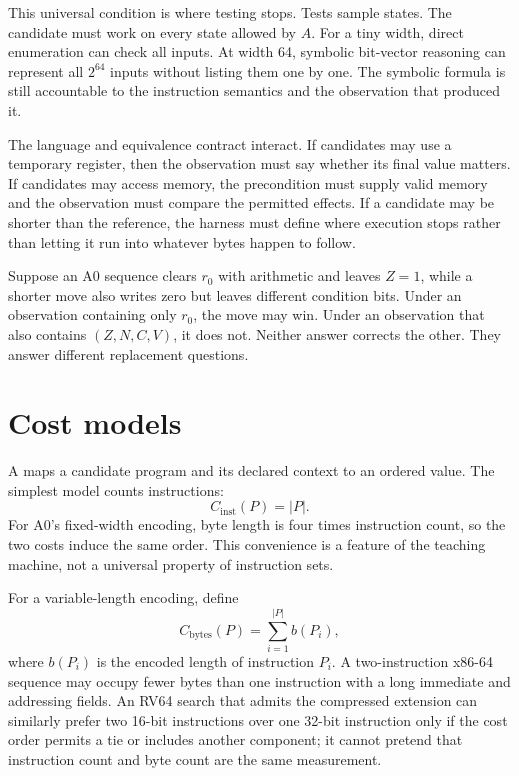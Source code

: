 This universal condition is where testing stops. Tests sample states. The
candidate must work on every state allowed by \(A\). For a tiny width, direct
enumeration can check all inputs. At width 64, symbolic bit-vector reasoning
can represent all \(2^{64}\) inputs without listing them one by one. The
symbolic formula is still accountable to the instruction semantics and the
observation that produced it.

The language and equivalence contract interact. If candidates may use a
temporary register, then the observation must say whether its final value
matters. If candidates may access memory, the precondition must supply valid
memory and the observation must compare the permitted effects. If a candidate
may be shorter than the reference, the harness must define where execution
stops rather than letting it run into whatever bytes happen to follow.

\begin{example}[title={One omitted flag changes the winner}]
Suppose an A0 sequence clears \(r_0\) with arithmetic and leaves \(Z=1\), while
a shorter move also writes zero but leaves different condition bits. Under an
observation containing only \(r_0\), the move may win. Under an observation
that also contains \((Z,N,C,V)\), it does not. Neither answer corrects the
other. They answer different replacement questions.
\end{example}

\section{Cost models}

A  maps a candidate program and its declared context to an
ordered value. The simplest model counts instructions:
\[
  C_{\mathrm{inst}}(P)=|P|.
\]
For A0's fixed-width encoding, byte length is four times instruction count,
so the two costs induce the same order. This convenience is a feature of the
teaching machine, not a universal property of instruction sets.

For a variable-length encoding, define
\[
  C_{\mathrm{bytes}}(P)=\sum_{i=1}^{|P|} b(P_i),
\]
where \(b(P_i)\) is the encoded length of instruction \(P_i\).
A two-instruction x86-64 sequence may occupy fewer bytes than one instruction
with a long immediate and addressing fields. An RV64 search that admits the
compressed extension can similarly prefer two 16-bit instructions over one
32-bit instruction only if the cost order permits a tie or includes another
component; it cannot pretend that instruction count and byte count are the
same measurement.

